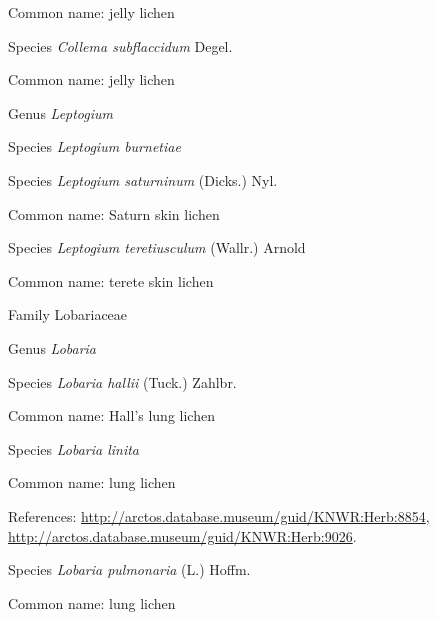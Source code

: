 \documentclass[9pt, article]{memoir}
\begin{document}
\begin{multicols}{2}
Common name: jelly lichen

\vspace{6pt}\noindent\hspace{36pt}Species \textit{Collema subflaccidum} Degel.


Common name: jelly lichen

\vspace{6pt}\noindent\hspace{30pt}Genus \textit{Leptogium}


\vspace{6pt}\noindent\hspace{36pt}Species \textit{Leptogium burnetiae}


\vspace{6pt}\noindent\hspace{36pt}Species \textit{Leptogium saturninum} (Dicks.) Nyl.


Common name: Saturn skin lichen

\vspace{6pt}\noindent\hspace{36pt}Species \textit{Leptogium teretiusculum} (Wallr.) Arnold


Common name: terete skin lichen

\vspace{6pt}\noindent\hspace{24pt}Family Lobariaceae


\vspace{6pt}\noindent\hspace{30pt}Genus \textit{Lobaria}


\vspace{6pt}\noindent\hspace{36pt}Species \textit{Lobaria hallii} (Tuck.) Zahlbr.


Common name: Hall's lung lichen

\vspace{6pt}\noindent\hspace{36pt}Species \textit{Lobaria linita}


Common name: lung lichen

References: 
\url{http://arctos.database.museum/guid/KNWR:Herb:8854}, 
\url{http://arctos.database.museum/guid/KNWR:Herb:9026}.

\vspace{6pt}\noindent\hspace{36pt}Species \textit{Lobaria pulmonaria} (L.) Hoffm.


Common name: lung lichen


\end{multicols}
\end{document}
